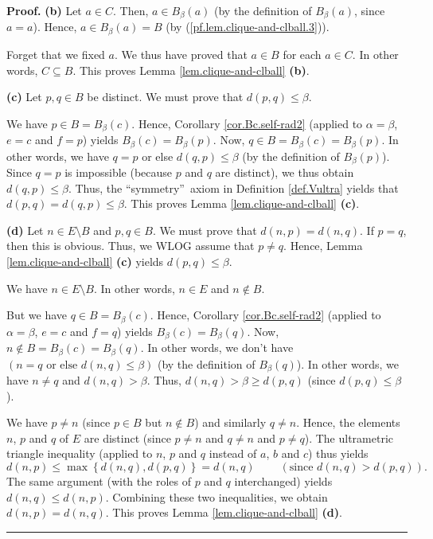 \documentclass[numbers=enddot,12pt,final,onecolumn,notitlepage]{scrartcl}%
\theoremstyle{definition}
\newenvironment{proof}[1][Proof]{\noindent\textbf{#1.} }{\ \rule{0.5em}{0.5em}}
\renewcommand{\leq}{\leqslant}
\renewcommand{\geq}{\geqslant}
\theoremstyle{plainsl}
\begin{document}
\begin{proof}
\textbf{(b)} Let $a\in C$. Then, $a\in B_{\beta}\left(  a\right)  $ (by the
definition of $B_{\beta}\left(  a\right)  $, since $a=a$). Hence, $a\in
B_{\beta}\left(  a\right)  =B$ (by (\ref{pf.lem.clique-and-clball.3})).

Forget that we fixed $a$. We thus have proved that $a\in B$ for each $a\in C$.
In other words, $C\subseteq B$. This proves Lemma \ref{lem.clique-and-clball}
\textbf{(b)}. \medskip

\textbf{(c)} Let $p,q\in B$ be distinct. We must prove that $d\left(
p,q\right)  \leq\beta$.

We have $p\in B=B_{\beta}\left(  c\right)  $. Hence, Corollary
\ref{cor.Bc.self-rad2} (applied to $\alpha=\beta$, $e=c$ and $f=p$) yields
$B_{\beta}\left(  c\right)  =B_{\beta}\left(  p\right)  $. Now, $q\in
B=B_{\beta}\left(  c\right)  =B_{\beta}\left(  p\right)  $. In other words, we
have $q=p$ or else $d\left(  q,p\right)  \leq\beta$ (by the definition of
$B_{\beta}\left(  p\right)  $). Since $q=p$ is impossible (because $p$ and $q$
are distinct), we thus obtain $d\left(  q,p\right)  \leq\beta$. Thus, the
\textquotedblleft symmetry\textquotedblright\ axiom in Definition
\ref{def.Vultra} yields that $d\left(  p,q\right)  =d\left(  q,p\right)
\leq\beta$. This proves Lemma \ref{lem.clique-and-clball} \textbf{(c)}.
\medskip

\textbf{(d)} Let $n\in E\setminus B$ and $p,q\in B$. We must prove that
$d\left(  n,p\right)  =d\left(  n,q\right)  $. If $p=q$, then this is obvious.
Thus, we WLOG assume that $p\neq q$. Hence, Lemma \ref{lem.clique-and-clball}
\textbf{(c)} yields $d\left(  p,q\right)  \leq\beta$.

We have $n\in E\setminus B$. In other words, $n\in E$ and $n\notin B$.

But we have $q\in B=B_{\beta}\left(  c\right)  $. Hence, Corollary
\ref{cor.Bc.self-rad2} (applied to $\alpha=\beta$, $e=c$ and $f=q$) yields
$B_{\beta}\left(  c\right)  =B_{\beta}\left(  q\right)  $. Now, $n\notin
B=B_{\beta}\left(  c\right)  =B_{\beta}\left(  q\right)  $. In other words, we
don't have $\left(  n=q\text{ or else }d\left(  n,q\right)  \leq\beta\right)
$ (by the definition of $B_{\beta}\left(  q\right)  $). In other words, we
have $n\neq q$ and $d\left(  n,q\right)  >\beta$. Thus, $d\left(  n,q\right)
>\beta\geq d\left(  p,q\right)  $ (since $d\left(  p,q\right)  \leq\beta$).

We have $p\neq n$ (since $p\in B$ but $n\notin B$) and similarly $q\neq n$.
Hence, the elements $n$, $p$ and $q$ of $E$ are distinct (since $p\neq n$ and
$q\neq n$ and $p\neq q$). The ultrametric triangle inequality (applied to $n$,
$p$ and $q$ instead of $a$, $b$ and $c$) thus yields%
\[
d\left(  n,p\right)  \leq\max\left\{  d\left(  n,q\right)  ,d\left(
p,q\right)  \right\}  =d\left(  n,q\right)  \ \ \ \ \ \ \ \ \ \ \left(
\text{since }d\left(  n,q\right)  >d\left(  p,q\right)  \right)  .
\]
The same argument (with the roles of $p$ and $q$ interchanged) yields
$d\left(  n,q\right)  \leq d\left(  n,p\right)  $. Combining these two
inequalities, we obtain $d\left(  n,p\right)  =d\left(  n,q\right)  $. This
proves Lemma \ref{lem.clique-and-clball} \textbf{(d)}.
\end{proof}
\end{document}

